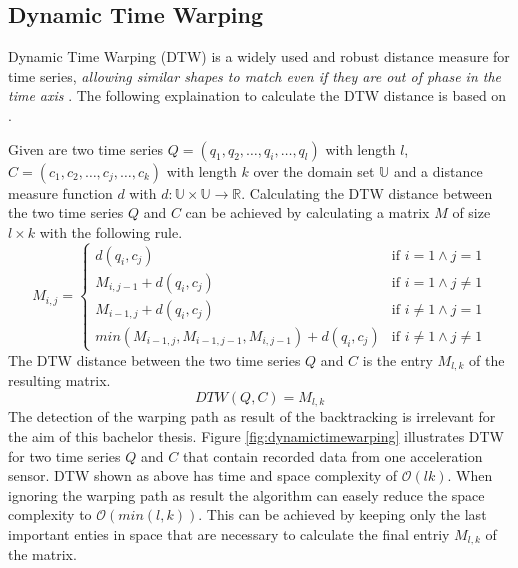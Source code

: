 \subsection{Dynamic Time Warping} \label{dynamic_time_warping}
Dynamic Time Warping (DTW) is a widely used and robust distance measure for time series, \textit{allowing similar shapes
to match even if they are out of phase in the time axis} \cite{keogh2002exact}. The following explaination to calculate
the DTW distance is based on \cite{sart2010accelerating}.

Given are two time series $Q = (q_1,\allowbreak q_2,\allowbreak \dots,\allowbreak q_i,\allowbreak \dots,\allowbreak q_l)$
with length $l$, $C = (c_1,\allowbreak c_2,\allowbreak \dots,\allowbreak c_j,\allowbreak \dots,\allowbreak c_k)$ with
length $k$ over the domain set $\mathbb{U}$ and a distance measure function $d$ with
$d: \mathbb{U} \times \mathbb{U} \to \mathbb{R}$. Calculating the DTW distance between the two time series $Q$ and $C$
can be achieved by calculating a matrix $M$ of size $l \times k$ with the following rule.
\begin{equation} \label{eq:dtw}
    M_{i, j} = \begin{cases}
        d(q_i,c_j) & \text{if } i = 1 \wedge j = 1\\
        M_{i,j-1} + d(q_i,c_j) & \text{if } i = 1 \wedge j \neq 1\\
        M_{i-1,j} + d(q_i,c_j) & \text{if } i \neq 1 \wedge j = 1\\
        min(M_{i-1,j}, M_{i-1,j-1}, M_{i,j-1}) + d(q_i,c_j) & \text{if } i \neq 1 \wedge j \neq 1
    \end{cases}
\end{equation}
The DTW distance between the two time series $Q$ and $C$ is the entry $M_{l,k}$ of the resulting matrix.
\begin{equation}
    DTW(Q, C) = M_{l,k}
\end{equation}
The detection of the warping path as result of the backtracking is irrelevant for the aim of this bachelor thesis.
Figure \ref{fig:dynamictimewarping} illustrates DTW for two time series $Q$ and $C$ that contain recorded data from one
acceleration sensor. DTW shown as above has time and space complexity of $\mathcal{O}(lk)$. When ignoring the
warping path as result the algorithm can easely reduce the space complexity to $\mathcal{O}(min(l, k))$. This can be
achieved by keeping only the last important enties in space that are necessary to calculate the final entriy $M_{l,k}$
of the matrix.

